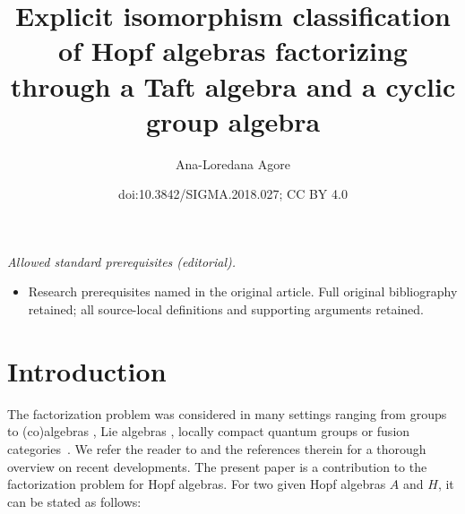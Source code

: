\documentclass[10pt,a4paper]{amsart}
\title{Explicit isomorphism classification of Hopf algebras factorizing through a Taft algebra and a cyclic group algebra}
\author{Ana-Loredana Agore}
\date{doi:10.3842/SIGMA.2018.027; CC BY 4.0}
\numberwithin{equation}{section}
\begin{document}
\maketitle
\noindent\textit{Allowed standard prerequisites (editorial).}\begin{itemize}
\item Research prerequisites named in the original article. Full original bibliography retained; all source-local definitions and supporting arguments retained.
\end{itemize}\medskip
\section{Introduction}
The factorization problem was considered in many settings ranging from groups \cite{acim, Ore, Takeuchi} to (co)algebras \cite{cap, CIMZ, Pena2}, Lie algebras \cite{majid3, Mic}, locally compact quantum groups \cite{VV} or fusion categories~\cite{SG}. We refer the reader to \cite{abm} and the references therein for a thorough overview on recent developments. The present paper is a contribution to the factorization problem for Hopf algebras. For two given Hopf algebras $A$ and $H$, it can be stated as follows:
\end{document}
